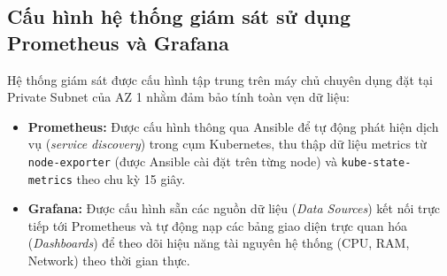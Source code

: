 \subsection{Cấu hình hệ thống giám sát sử dụng Prometheus và Grafana}

Hệ thống giám sát được cấu hình tập trung trên máy chủ chuyên dụng đặt tại Private Subnet của AZ 1 nhằm đảm bảo tính toàn vẹn dữ liệu:
\begin{itemize}
    \item \textbf{Prometheus:} Được cấu hình thông qua Ansible để tự động phát hiện dịch vụ (\textit{service discovery}) trong cụm Kubernetes, thu thập dữ liệu metrics từ \texttt{node-exporter} (được Ansible cài đặt trên từng node) và \texttt{kube-state-metrics} theo chu kỳ 15 giây.
    \item \textbf{Grafana:} Được cấu hình sẵn các nguồn dữ liệu (\textit{Data Sources}) kết nối trực tiếp tới Prometheus và tự động nạp các bảng giao diện trực quan hóa (\textit{Dashboards}) để theo dõi hiệu năng tài nguyên hệ thống (CPU, RAM, Network) theo thời gian thực.
\end{itemize}
